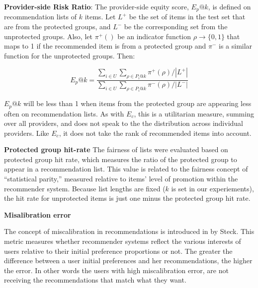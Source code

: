         
        \textbf{Provider-side Risk Ratio}: The provider-side equity score, $E_p@k$, is defined on recommendation lists of $k$ items. Let $L^+$ be the set of items in the test set that are from the protected groups, and $L^-$ be the corresponding set from the unprotected groups. Also, let $\pi^+()$ be an indicator function $\rho \rightarrow \{0,1\}$ that maps to 1 if the recommended item is from a protected group and $\pi^-$ is a similar function for the unprotected groups. Then:

        \begin{equation}
        E_p@k=\frac{\sum_{i \in U}{\sum_{\rho \in P_i@k}{\pi^+(\rho)}}/|L^+|}
        {\sum_{i \in U}{\sum_{\rho \in P_i@k}{\pi^-(\rho)}}/|L^-|}
        \end{equation}
        
        $E_p@k$ will be less than 1 when items from the protected group are appearing less often on recommendation lists. As with $E_c$, this is a utilitarian measure, summing over all providers, and does not speak to the the distribution across individual providers. Like $E_c$, it does not take the rank of recommended items into account.


        \textbf{Protected group hit-rate}
        The fairness of lists were evaluated based on protected group hit rate, which measures the ratio of the protected group to appear in a recommendation list. This value is related to the fairness concept of ``statistical parity,'' measured relative to items' level of promotion within the recommender system. Because list lengths are fixed ($k$ is set in our experiements), the hit rate for unprotected items is just one minus the protected group hit rate. 
        
    
        \textbf{Misalibration error}
        
        The concept of miscalibration in recommendations is introduced in \cite{steck2018calibrated} by Steck. This metric measures whether recommender systems reflect the various interests of users relative to their initial preference proportions or not. The greater the difference between a user initial preferences and her recommendations, the higher the error. In other words the users with high miscalibration error, are not receiving the recommendations that match what they want.
        

